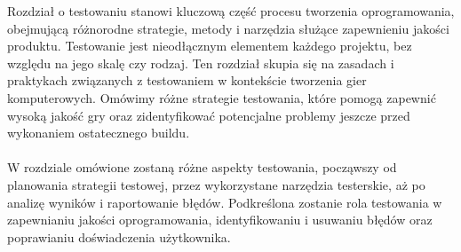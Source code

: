 Rozdział o testowaniu stanowi kluczową część procesu tworzenia oprogramowania, obejmującą różnorodne strategie, metody i narzędzia służące zapewnieniu jakości produktu. Testowanie jest nieodłącznym elementem każdego projektu, bez względu na jego skalę czy rodzaj. Ten rozdział skupia się na zasadach i praktykach związanych z testowaniem w kontekście tworzenia gier komputerowych. Omówimy różne strategie testowania, które pomogą zapewnić wysoką jakość gry oraz zidentyfikować potencjalne problemy jeszcze przed wykonaniem ostatecznego buildu. \\ \\
W rozdziale omówione zostaną różne aspekty testowania, począwszy od planowania strategii testowej, przez wykorzystane narzędzia testerskie, aż po analizę wyników i raportowanie błędów. Podkreślona zostanie rola testowania w zapewnianiu jakości oprogramowania, identyfikowaniu i usuwaniu błędów oraz poprawianiu doświadczenia użytkownika.